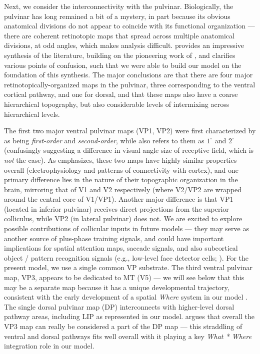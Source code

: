 \documentclass[11pt,twoside]{article}
\newif\myifpdf
\begin{document}
Next, we consider the interconnectivity with the pulvinar.  Biologically, the pulvinar has long remained a bit of a mystery, in part because its obvious anatomical divisions do not appear to coincide with its functional organization --- there are coherent retinotopic maps that spread across multiple anatomical divisions, at odd angles, which makes analysis difficult.   provides an impressive synthesis of the literature, building on the pioneering work of , and clarifies various points of confusion, such that we were able to build our model on the foundation of this synthesis.  The major conclusions are that there are four major retinotopically-organized maps in the pulvinar, three corresponding to the ventral cortical pathway, and one for dorsal, and that these maps also have a coarse hierarchical topography, but also considerable levels of intermixing across hierarchical levels.

The first two major ventral pulvinar maps (VP1, VP2) were first characterized by  as being {\em first-order} and {\em second-order}, while  also refers to them as $1^\circ$ and $2^\circ$ (confusingly suggesting a difference in visual angle size of receptive field, which is {\em not} the case).  As  emphasizes, these two maps have highly similar properties overall (electrophysiology and patterns of connectivity with cortex), and one primary difference lies in the nature of their topographic organization in the brain, mirroring that of V1 and V2 respectively (where V2/VP2 are wrapped around the central core of V1/VP1).  Another major difference is that VP1 (located in inferior pulvinar) receives direct projections from the superior colliculus, while VP2 (in lateral pulvinar) does not.  We are excited to explore possible contributions of collicular inputs in future models --- they may serve as another source of plus-phase training signals, and could have important implications for spatial attention maps, saccade signals, and also subcortical object / pattern recognition signals (e.g., low-level face detector cells; ). For the present model, we use a single common VP substrate.  The third ventral pulvinar map, VP3, appears to be dedicated to MT (V5) --- we will see below that this may be a separate map because it has a unique developmental trajectory, consistent with the early development of a spatial {\em Where} system in our model \cite{BridgeLeopoldBourne16}.  The single dorsal pulvinar map (DP) interconnects with higher-level dorsal pathway areas, including LIP as represented in our model.   argues that overall the VP3 map can really be considered a part of the DP map --- this straddling of ventral and dorsal pathways fits well overall with it playing a key {\em What * Where} integration role in our model.
\end{document}
